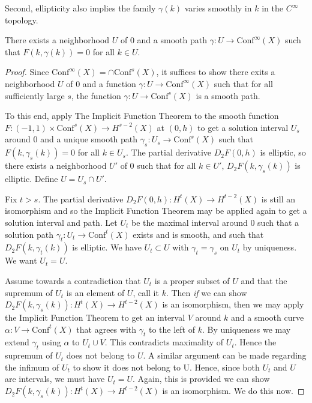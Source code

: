 Second, ellipticity also implies the family $\gamma(k)$ varies smoothly in $k$ in the $C^\infty$ topology. 

\begin{prop}
There exists a neighborhood $U$ of $0$ and a smooth path $\gamma: U \to \mathrm{Conf}^\infty(X)$ such that $F(k,\gamma(k)) = 0$ for all $k \in U$. 
\end{prop}

\begin{proof}
Since $\mathrm{Conf}^\infty(X) = \cap \mathrm{Conf}^s(X)$, it suffices to show there exits a neighborhood $U$ of 0 and a function $\gamma: U \to \mathrm{Conf}^\infty(X)$ such that for all sufficiently large $s$, the function $\gamma: U \to \mathrm{Conf}^s(X)$ is a smooth path.

To this end, apply The Implicit Function Theorem to the smooth function $F: (-1,1) \times \mathrm{Conf}^s(X) \to H^{s-2}(X)$ at $(0,h)$ to get a solution interval $U_s$ around $0$ and a unique smooth path $\gamma_s: U_s \to \mathrm{Conf}^s(X)$ such that $F(k, \gamma_s(k))=0$ for all $k \in U_s$. 
The partial derivative $D_2F(0,h)$ is elliptic, so there exists a neighborhood $U'$ of 0 such that for all $k \in U'$, $D_2F(k,\gamma_s(k))$ is elliptic. 
Define $U = U_s \cap U'$.

Fix $t > s$. 
The partial derivative $D_2F(0,h): H^t(X) \to H^{t-2}(X)$ is still an isomorphism and so the Implicit Function Theorem may be applied again to get a solution interval and path. 
Let $U_t$ be the maximal interval around $0$ such that a solution path $\gamma_t: U_t \to \mathrm{Conf}^t(X)$ exists and is smooth, and such that $D_2F(k,\gamma_t(k))$ is elliptic. 
We have $U_t \subset U$ with $\gamma_t = \gamma_s$ on $U_t$ by uniqueness. 
We want $U_t = U$. 

Assume towards a contradiction that $U_t$ is a proper subset of $U$ and that the supremum of $U_t$ is an element of $U$, call it $k$. 
Then \textit{if} we can show $D_2F(k,\gamma_s(k)) : H^t(X) \to H^{t-2}(X)$ is an isomorphism, then we may apply the Implicit Function Theorem to get an interval $V$ around $k$ and a smooth curve $\alpha: V \to \mathrm{Conf}^t(X)$ that agrees with $\gamma_t$ to the left of $k$. 
By uniqueness we may extend $\gamma_t$ using $\alpha$ to $U_t \cup V$. 
This contradicts maximality of $U_t$. 
Hence the supremum of $U_t$ does not belong to $U$. 
A similar argument can be made regarding the infimum of $U_t$ to show it does not belong to U. 
Hence, since both $U_t$ and $U$ are intervals, we must have $U_t = U$.
Again, this is provided we can show $D_2F(k,\gamma_s(k)) : H^t(X) \to H^{t-2}(X)$ is an isomorphism.
We do this now. 


\end{proof}
